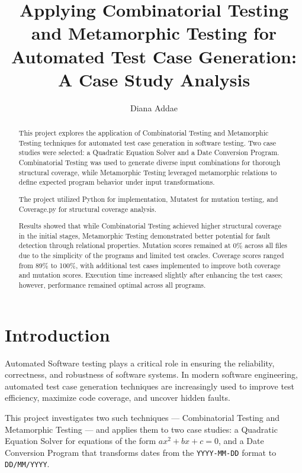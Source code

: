 \documentclass[conference]{IEEEtran}
\begin{document}
\title{Applying Combinatorial Testing and Metamorphic Testing for Automated Test Case Generation: A Case Study Analysis}

\author{Diana Addae}

\maketitle

\begin{abstract}
This project explores the application of Combinatorial Testing and Metamorphic Testing techniques for automated test case generation in software testing. Two case studies were selected: a Quadratic Equation Solver and a Date Conversion Program. Combinatorial Testing was used to generate diverse input combinations for thorough structural coverage, while Metamorphic Testing leveraged metamorphic relations to define expected program behavior under input transformations.
    
The project utilized Python for implementation, Mutatest for mutation testing, and Coverage.py for structural coverage analysis. 

Results showed that while Combinatorial Testing achieved higher structural coverage in the initial stages, Metamorphic Testing demonstrated better potential for fault detection through relational properties. Mutation scores remained at 0\% across all files due to the simplicity of the programs and limited test oracles. Coverage scores ranged from 89\% to 100\%, with additional test cases implemented to improve both coverage and mutation scores. Execution time increased slightly after enhancing the test cases; however, performance remained optimal across all programs.
\end{abstract}

\section{Introduction}
Automated Software testing plays a critical role in ensuring the reliability, correctness, and robustness of software systems. In modern software engineering, automated test case generation techniques are increasingly used to improve test efficiency, maximize code coverage, and uncover hidden faults.

This project investigates two such techniques — Combinatorial Testing and Metamorphic Testing — and applies them to two case studies: a Quadratic Equation Solver for equations of the form $ax^2 + bx + c = 0$, and a Date Conversion Program that transforms dates from the \texttt{YYYY-MM-DD} format to \texttt{DD/MM/YYYY}.
\end{document}
